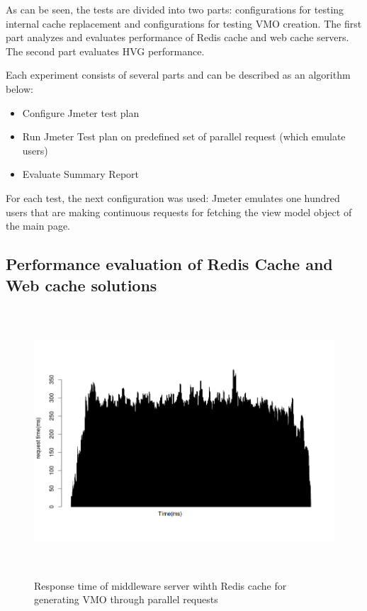 As can be seen, the tests are divided into two parts: configurations for testing internal cache replacement and configurations for testing VMO creation. The first part analyzes and evaluates performance of Redis cache and web cache servers. The second part evaluates HVG performance.

Each experiment consists of several parts and can be described as an algorithm below: 

\begin{itemize}
  \item Configure Jmeter test plan
  \item Run Jmeter Test plan on predefined set of parallel request (which emulate users)
  \item Evaluate Summary Report
\end{itemize}

For each test, the next configuration was used: Jmeter emulates one hundred users that are making continuous requests for fetching the view model object of the main page.  


\subsection{Performance evaluation of Redis Cache and Web cache solutions}

\begin{figure}[h!]
    \centering
    \includegraphics[width=15cm,height=10cm,keepaspectratio]{images/vmo_redis_mult_par.png}
    \caption{Response time of middleware server wihth Redis cache for generating VMO through parallel requests}
    \label{fig:vmo_redis_mult_par}
\end{figure}


